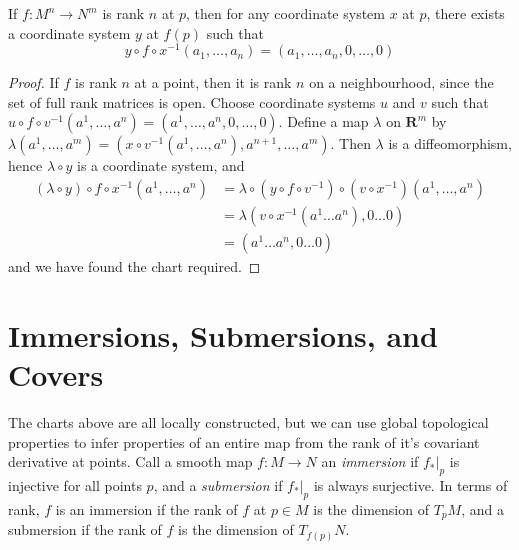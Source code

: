 \begin{corollary}
    If $f: M^n \to N^m$ is rank $n$ at $p$, then for any coordinate system $x$ at $p$, there exists a coordinate system $y$ at $f(p)$ such that
    \[ y \circ f \circ x^{-1} (a_1, \dots, a_n) = (a_1, \dots, a_n, 0, \dots, 0) \]
\end{corollary}
\begin{proof}
    If $f$ is rank $n$ at a point, then it is rank $n$ on a neighbourhood, since the set of full rank matrices is open. Choose coordinate systems $u$ and $v$ such that $u \circ f \circ v^{-1}(a^1, \dots, a^n) = (a^1, \dots, a^n, 0, \dots, 0)$. Define a map $\lambda$ on $\mathbf{R}^m$ by $\lambda(a^1, \dots, a^m) = (x \circ v^{-1}(a^1, \dots, a^n), a^{n+1}, \dots, a^m)$. Then $\lambda$ is a diffeomorphism, hence $\lambda \circ y$ is a coordinate system, and
    \begin{align*}
        (\lambda \circ y) \circ f \circ x^{-1} (a^1, \dots, a^n) &= \lambda \circ (y \circ f \circ v^{-1}) \circ (v \circ x^{-1}) (a^1, \dots, a^n)\\
        &= \lambda (v \circ x^{-1} (a^1 \dots a^n), 0 \dots 0)\\
        &= (a^1 \dots a^n, 0 \dots 0)
    \end{align*}
    and we have found the chart required.
\end{proof}

\section{Immersions, Submersions, and Covers}

The charts above are all locally constructed, but we can use global topological properties to infer properties of an entire map from the rank of it's covariant derivative at points. Call a smooth map $f:M \to N$ an \emph{immersion} if $f_*|_p$ is injective for all points $p$, and a \emph{submersion} if $f_*|_p$ is always surjective. In terms of rank, $f$ is an immersion if the rank of $f$ at $p \in M$ is the dimension of $T_pM$, and a submersion if the rank of $f$ is the dimension of $T_{f(p)}N$.

